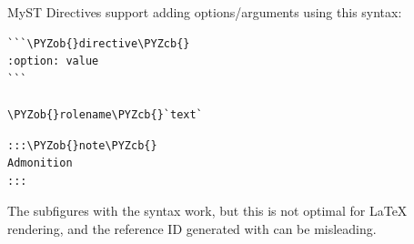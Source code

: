 \documentclass[a4paper,twoside]{article}
\begin{document}
MyST Directives support adding options/arguments using this syntax:
\begin{tscode}[lang=md, engine=pygments]
\begin{Verbatim}[commandchars=\\\{\},breaklines, breakanywhere, commandchars=\\\{\}]
```\PYZob{}directive\PYZcb{}
:option: value
```

\PYZob{}rolename\PYZcb{}`text`
\end{Verbatim}
\end{tscode}
\begin{tscode}[lang=md, engine=pygments]
\begin{Verbatim}[commandchars=\\\{\},breaklines, breakanywhere, commandchars=\\\{\}]
:::\PYZob{}note\PYZcb{}
Admonition
:::
\end{Verbatim}
\end{tscode}
The subfigures with the  syntax work, but this is not optimal for \LaTeX{} rendering, and the reference ID generated with  can be misleading.
\end{document}
